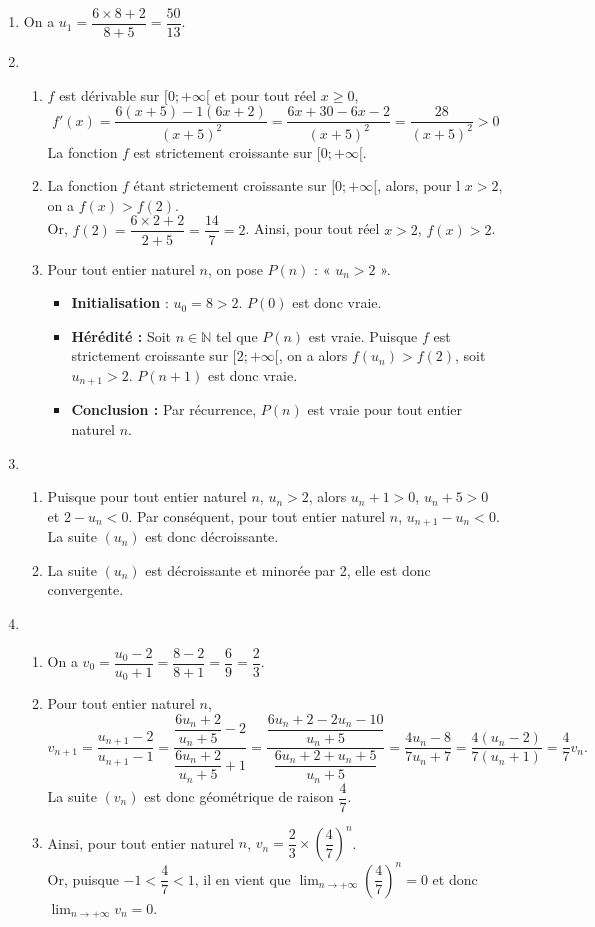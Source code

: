 \documentclass[11pt,fleqn, openany]{book} %
\begin{document}
\begin{solution}
\begin{enumerate}
\item  On a $u_1=\dfrac{6\times 8 +2}{8+5}=\dfrac{50}{13}$.
\item 
\begin{enumerate}
\item $f$ est dérivable sur $[0;+\infty[$ et pour tout réel $x\geqslant0$, \[f'(x)= \dfrac{6(x+5)-1(6x+2)}{(x+5)^2}=\dfrac{6x+30-6x-2}{(x+5)^2}=\dfrac{28}{(x+5)^2}>0\] La fonction $f$ est strictement croissante sur $[0;+\infty [$.
\item La fonction $f$ étant strictement croissante sur $[0;+\infty[$, alors, pour l $x>2$, on a $f(x)>f(2)$. \\Or, $f(2)=\dfrac{6\times 2 +2}{2+5}=\dfrac{14}{7}=2$. Ainsi, pour tout réel $x>2$, $f(x)>2$.
\item Pour tout entier naturel $n$, on pose $P(n)$ : « $u_n >2$ ».
\begin{itemize}
\item \textbf{Initialisation} : $u_0=8>2$. $P(0)$ est donc vraie.
\item \textbf{Hérédité :} Soit $n\in\mathbb{N}$ tel que $P(n)$ est vraie. Puisque $f$ est strictement croissante sur $[2;+\infty[$, on a alors $f(u_n)>f(2)$, soit $u_{n+1}>2$. $P(n+1)$ est donc vraie.
\item \textbf{Conclusion :} Par récurrence, $P(n)$ est vraie pour tout entier naturel $n$.
\end{itemize}
\end{enumerate}
\item \begin{enumerate}
\item Puisque pour tout entier naturel $n$, $u_n>2$, alors $u_n+1>0$, $u_n+5>0$ et $2-u_n<0$. Par conséquent, pour tout entier naturel $n$, $u_{n+1}-u_n <0$. La suite $(u_n)$ est donc décroissante.
\item La suite $(u_n)$ est décroissante et minorée par 2, elle est donc convergente.
\end{enumerate}
\item 
\begin{enumerate}
\item On a $v_0=\dfrac{u_0-2}{u_0+1}=\dfrac{8-2}{8+1}=\dfrac{6}{9}=\dfrac{2}{3}$.
\item Pour tout entier naturel $n$,
\[v_{n+1}=\dfrac{u_{n+1}-2}{u_{n+1}-1}=\dfrac{\dfrac{6u_n+2}{u_n+5}-2}{\dfrac{6u_n+2}{u_n+5}+1}=\dfrac{\dfrac{6u_n+2-2u_n-10}{u_n+5}}{\dfrac{6u_n+2+u_n+5}{u_n+5}}=\dfrac{4u_n-8}{7u_n+7}=\dfrac{4(u_n-2)}{7(u_n+1)}=\dfrac{4}{7}v_n.\]
La suite $(v_n)$ est donc géométrique de raison $\dfrac{4}{7}$.
\item Ainsi, pour tout entier naturel $n$, $v_n=\dfrac{2}{3} \times \left( \dfrac{4}{7}\right)^n$.\\ Or, puisque $-1<\dfrac{4}{7}<1$, il en vient que $\displaystyle\lim_{n\to+\infty}\left(\dfrac{4}{7}\right)^n=0$ et donc $\displaystyle\lim_{n\to+\infty}v_n=0$.


\end{enumerate}
\end{enumerate}
\end{solution}
\end{document}
